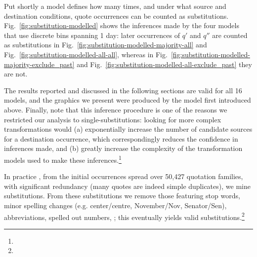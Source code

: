 \begin{new}

Put shortly a model defines how many times, and under what source and destination conditions, quote occurrences can be counted as substitutions.
Fig.~\ref{fig:substitution-modelled} shows the inferences made by the four models that use discrete %
bins spanning 1 day:
later occurrences of $q'$ and $q''$ are counted as substitutions in Fig.~\ref{fig:substitution-modelled-majority-all} and Fig.~\ref{fig:substitution-modelled-all-all}, whereas in Fig.~\ref{fig:substitution-modelled-majority-exclude_past} and Fig.~\ref{fig:substitution-modelled-all-exclude_past} they are not.

The results reported and discussed in the following sections are valid for all 16 models, and the graphics we present were produced by the model first introduced above.
Finally, note that this inference procedure is one of the reasons we restricted our analysis to single-substitutions:
looking for more complex transformations would
(a) exponentially increase the number of candidate sources for a destination occurrence, which correspondingly reduces the confidence in inferences made,
and (b) greatly increase the complexity of the transformation models used to make these inferences.\footnote{
}

\end{new}

\medskip

In practice , from the  initial occurrences spread over 50,427 quotation families, with significant redundancy (many quotes are indeed simple duplicates), we mine  substitutions.
From these substitutions we remove those featuring stop words, minor spelling changes (\hbox{e.g.} center/centre, November/Nov, Senator/Sen), abbreviations, spelled out numbers, ;
this eventually yields  valid substitutions.\footnote{
}

